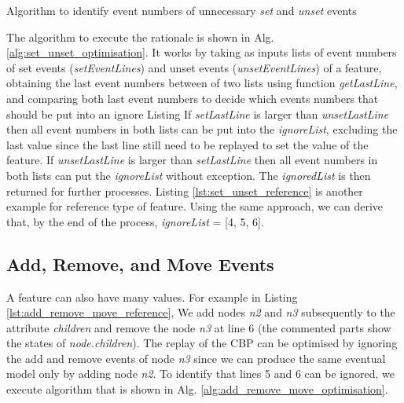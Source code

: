 \documentclass{llncs}
\begin{document}
\begin{algorithm}[H]
\begin{small}
\end{small}
\caption{Algorithm to identify event numbers of unnecessary \emph{set} and \emph{unset} events}
\label{alg:set_unset_optimisation}
\end{algorithm}

The algorithm to execute the rationale is shown in Alg. \ref{alg:set_unset_optimisation}. It works by taking as inputs lists of event numbers of set events (\emph{setEventLines}) and unset events (\emph{unsetEventLines}) of a feature, obtaining the last event numbers between of two lists using function \emph{getLastLine}, and comparing both last event numbers to decide which events numbers that should be put into an ignore Listing If \emph{setLastLine} is larger than \emph{unsetLastLine} then all event numbers in both lists can be put into the \emph{ignoreList}, excluding the last value since the last line still need to be replayed to set the value of the feature. If \emph{unsetLastLine} is larger than \emph{setLastLine} then all event numbers in both lists can put the \emph{ignoreList} without exception. The \emph{ignoredList} is then returned for further processes. Listing \ref{lst:set_unset_reference} is another example for reference type of feature. Using the same approach, we can derive that, by the end of the process, \emph{ignoreList} = [4, 5, 6].   

\subsection{Add, Remove, and Move Events}
\label{subsec:add_remove_and_move_operations}
A feature can also have many values. For example in Listing \ref{lst:add_remove_move_reference},  We add nodes \emph{n2} and \emph{n3} subsequently to the attribute \emph{children} and remove the node \emph{n3} at line 6  (the commented parts show the states of \emph{node.children}). The replay of the CBP can be optimised by ignoring the add and remove events of node \emph{n3} since we can produce the same eventual model only by adding node \emph{n2}. To identify that lines 5 and 6 can be ignored, we execute algorithm that is shown in Alg. \ref{alg:add_remove_move_optimisation}.  
\end{document}
